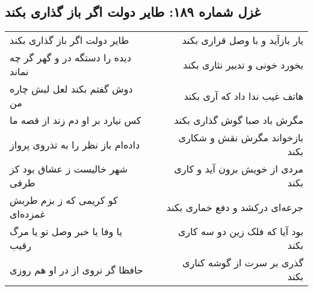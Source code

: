 \begin{center}
\section*{غزل شماره ۱۸۹: طایر دولت اگر باز گذاری بکند}
\label{sec:sh189}
\begin{longtable}{l p{0.5cm} r}
طایر دولت اگر باز گذاری بکند
&&
یار بازآید و با وصل قراری بکند
\\
دیده را دستگه در و گهر گر چه نماند
&&
بخورد خونی و تدبیر نثاری بکند
\\
دوش گفتم بکند لعل لبش چاره من
&&
هاتف غیب ندا داد که آری بکند
\\
کس نیارد بر او دم زند از قصه ما
&&
مگرش باد صبا گوش گذاری بکند
\\
داده‌ام باز نظر را به تذروی پرواز
&&
بازخواند مگرش نقش و شکاری بکند
\\
شهر خالیست ز عشاق بود کز طرفی
&&
مردی از خویش برون آید و کاری بکند
\\
کو کریمی که ز بزم طربش غمزده‌ای
&&
جرعه‌ای درکشد و دفع خماری بکند
\\
یا وفا یا خبر وصل تو یا مرگ رقیب
&&
بود آیا که فلک زین دو سه کاری بکند
\\
حافظا گر نروی از در او هم روزی
&&
گذری بر سرت از گوشه کناری بکند
\\
\end{longtable}
\end{center}
